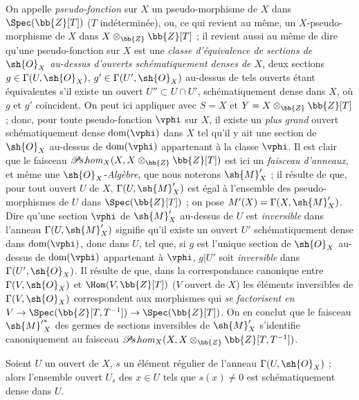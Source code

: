 \begin{env}[20.2.8]
On appelle \emph{pseudo-fonction} sur $X$ un pseudo-morphisme de $X$ dans $\Spec(\bb{Z}[T])$ ($T$ indéterminée), ou, ce qui revient au même, un $X$-pseudo-morphisme de $X$ dans $X\otimes_{\bb{Z}}\bb{Z}[T]$ ; il revient aussi au même  de dire qu'une pseudo-fonction sur $X$ est une \emph{classe d'équivalence de sections de $\sh{O}_X$ au-dessus d'ouverts schématiquement denses de $X$}, deux sections $g\in\Gamma(U,\sh{O}_X)$, $g'\in\Gamma(U',\sh{O}_X)$ au-dessus de tels ouverts étant équivalentes s'il existe un ouvert $U''\subset U\cap U'$, schématiquement dense dans $X$, où $g$ et $g'$ coïncident.
On peut ici appliquer  avec $S=X$ et $Y=X\otimes_{\bb{Z}}\bb{Z}[T]$ ; donc, pour toute pseudo-fonction $\vphi$ sur $X$, il existe un \emph{plus grand} ouvert schématiquement dense $\operatorname{dom}(\vphi)$ dans $X$ tel qu'il y ait une section de $\sh{O}_X$ au-dessus de $\operatorname{dom}(\vphi)$ appartenant à la classe $\vphi$.
Il est clair que le faisceau $\mathscr{P}\!s.\!\mathit{hom}_X(X,X\otimes_{\bb{Z}}\bb{Z}[T])$ est ici un \emph{faisceau d'anneaux}, et même une $\sh{O}_X$-\emph{Algèbre}, que nous noterons $\sh{M}'_X$ ; il résulte de  que, pour tout ouvert $U$ de $X$, $\Gamma(U,\sh{M}'_X)$ est égal à l'ensemble des pseudo-morphismes de $U$ dans $\Spec(\bb{Z}[T])$ ; on pose $M'(X)=\Gamma(X,\sh{M}'_X)$.
Dire qu'une section $\vphi$ de $\sh{M}'_X$ au-dessus de $U$ est \emph{inversible} dans l'anneau $\Gamma(U,\sh{M}'_X)$ signifie qu'il existe un ouvert $U'$ schématiquement dense dans $\operatorname{dom}(\vphi)$, donc dans $U$, tel que, si $g$ est l'unique section de $\sh{O}_X$ au-dessus de $\operatorname{dom}(\vphi)$ appartenant à $\vphi$, $g|U'$ soit \emph{inversible} dans $\Gamma(U',\sh{O}_X)$.
Il résulte de  que, dans la correspondance canonique entre $\Gamma(V,\sh{O}_X)$ et $\Hom(V,\bb{Z}[T])$ ($V$ ouvert de $X$) les éléments inversibles de $\Gamma(V,\sh{O}_X)$ correspondent aux morphismes qui \emph{se}
\emph{factorisent en} $V\to\Spec(\bb{Z}[T,T^{-1}])\to\Spec(\bb{Z}[T])$.
On en conclut que le faisceau ${\sh{M}'}^*_X$ des germes de sections inversibles de $\sh{M}'_X$ s'identifie canoniquement au faisceau $\mathscr{P}\!s.\!\mathit{hom}_X(X,X\otimes_{\bb{Z}}\bb{Z}[T,T^{-1}])$.
\end{env}

\begin{lemma}[20.2.9]
\label{IV.20.2.9}
Soient $U$ un ouvert de $X$, $s$ un élément régulier de l'anneau $\Gamma(U,\sh{O}_X)$ ; alors l'ensemble ouvert $U_s$ des $x\in U$ tels que $s(x)\neq0$ est schématiquement dense dans $U$.
\end{lemma}

